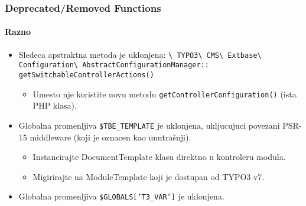 \begin{frame}[fragile]
	\frametitle{Deprecated/Removed Functions}
	\framesubtitle{Razno}

	\begin{itemize}

		\item Sledeca apstraktna metoda je uklonjena:\newline
			\smaller
				\texttt{\textbackslash
					TYPO3\textbackslash
					CMS\textbackslash
					Extbase\textbackslash
					Configuration\textbackslash
					AbstractConfigurationManager::}\newline
					\texttt{getSwitchableControllerActions()}
			\normalsize

			\begin{itemize}\smaller
				\item[\ding{228}] Umesto nje koristite novu metodu \texttt{getControllerConfiguration()} (ista PHP klasa).
			\end{itemize}\normalsize

		\item Globalna promenljiva \texttt{\$TBE\_TEMPLATE} je uklonjena, ukljucujuci
		 	povezani PSR-15 middleware (koji je oznacen kao unutrašnji).

			\begin{itemize}\smaller
				\item[\ding{228}] Instancirajte DocumentTemplate klasu direktno u kontroleru modula.
				\item[\ding{228}] Migirirajte na ModuleTemplate koji je dostupan od TYPO3 v7.
			\end{itemize}\normalsize

		\item Globalna promenljiva \texttt{\$GLOBALS['T3\_VAR']} je uklonjena.\newline

	\end{itemize}

\end{frame}

